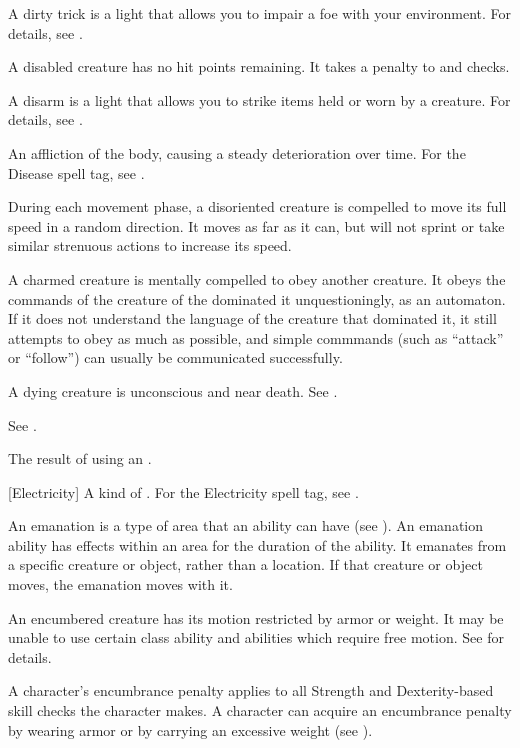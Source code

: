  A dirty trick is a light  that allows you to impair a foe with your environment.
For details, see .

 A disabled creature has no hit points remaining.
It takes a  penalty to  and checks.

 A disarm is a light  that allows you to strike items held or worn by a creature.
For details, see .

 An affliction of the body, causing a steady deterioration over time. For the Disease spell tag, see .

 During each movement phase, a disoriented creature is compelled to move its full speed in a random direction.
It moves as far as it can, but will not sprint or take similar strenuous actions to increase its speed.

 A charmed creature is mentally compelled to obey another creature.
It obeys the commands of the creature of the dominated it unquestioningly, as an automaton.
If it does not understand the language of the creature that dominated it, it still attempts to obey as much as possible, and simple commmands (such as ``attack'' or ``follow'') can usually be communicated successfully.

 A dying creature is unconscious and near death. See .

 See .

 The result of using an .

[Electricity] A kind of . For the Electricity spell tag, see .

 An emanation is a type of area that an ability can have (see ).
An emanation ability has effects within an area for the duration of the ability.
It emanates from a specific creature or object, rather than a location.
If that creature or object moves, the emanation moves with it.

 An encumbered creature has its motion restricted by armor or weight. It may be unable to use certain class ability and abilities which require free motion. See  for details.

 A character's encumbrance penalty applies to all Strength and Dexterity-based skill checks the character makes.
A character can acquire an encumbrance penalty by wearing armor or by carrying an excessive weight (see ).

